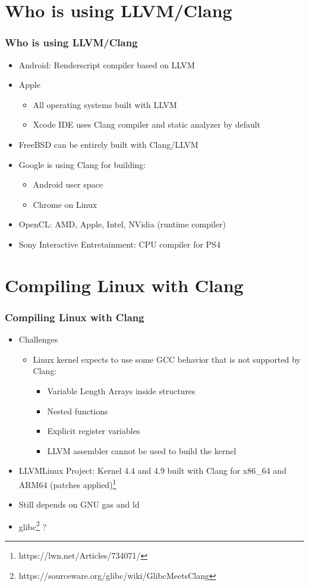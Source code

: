 \documentclass{beamer}
\begin{document}
\section{Who is using LLVM/Clang}

\begin{frame}
\frametitle{Who is using LLVM/Clang}
\begin{itemize}
  \item Android: Renderscript compiler based on LLVM
  \item Apple
  \begin{itemize}
    \item All operating systems built with LLVM
    \item Xcode IDE uses Clang compiler and static analyzer by default
  \end{itemize}
  \item FreeBSD can be entirely built with Clang/LLVM
  \item Google is using Clang for building:
  \begin{itemize}
    \item Android user space
    \item Chrome on Linux
  \end{itemize}
  \item OpenCL: AMD, Apple, Intel, NVidia (runtime compiler)
  \item Sony Interactive Entretainment: CPU compiler for PS4
\end{itemize}
\end{frame}
\section{Compiling Linux with Clang}

\begin{frame}
\frametitle{Compiling Linux with Clang}
\begin{itemize}
  \item Challenges
  \begin{itemize}
    \item Linux kernel expects to use some GCC behavior that is not supported by Clang:
    \begin{itemize}
      \item Variable Length Arrays inside structures
      \item Nested functions
      \item Explicit register variables
      \item LLVM assembler cannot be used to build the kernel
    \end{itemize}
  \end{itemize}
  \item LLVMLinux Project: Kernel 4.4 and 4.9 built with Clang for x86\_64 and ARM64
  (patches applied)\footnote{https://lwn.net/Articles/734071/}
  \item Still depends on GNU {\selectfont gas} and {\selectfont ld}
  \item glibc\footnote{https://sourceware.org/glibc/wiki/GlibcMeetsClang} ?
\end{itemize}
\end{frame}
\end{document}
